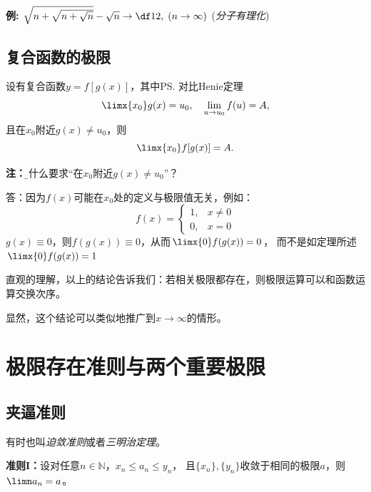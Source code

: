 {\bf 例:} $\sqrt{n+\sqrt{n+\sqrt n}}-\sqrt n\to\df12,\;(n\to\infty)$
\hfill({\it 分子有理化})

\subsection{复合函数的极限}

设有复合函数$y=f[g(x)]$，其中\ps{对比Henie定理}
$$\limx{x_0}g(x)=u_0,\quad\lim\limits_{u\to u_0}f(u)=A,$$
且在$x_0$附近$g(x)\ne u_0$，则
$$\limx{x_0}f[g(x)]=A.$$

{\bf 注：}{\b 为什么要求“在$x_0$附近$g(x)\ne u_0$”？}
  
  答：因为$f(x)$可能在$x_0$处的定义与极限值无关，例如：
  $$f(x)=\left\{\begin{array}{ll}
  1,&x\ne0\\0,&x=0
  \end{array}\right.$$
  $g(x)\equiv 0$，则$f(g(x))\equiv0$，从而$\limx{0}f(g(x))=0$，
  而不是如定理所述$\limx{0}f(g(x))=1$

直观的理解，以上的结论告诉我们：若相关极限都存在，则极限运算可以和函数运算交换次序。

显然，这个结论可以类似地推广到$x\to\infty$的情形。

\section{极限存在准则与两个重要极限}

\subsection{夹逼准则}

有时也叫{\it 迫敛准则}或者{\it 三明治定理}。

{\bf 准则I：}设对任意$n\in\mathbb{N}$，$x_n\le a_n\le y_n$，
且$\{x_n\},\{y_n\}$收敛于相同的极限$a$，则$\limn a_n=a$。

\begin{center}
\end{center}

